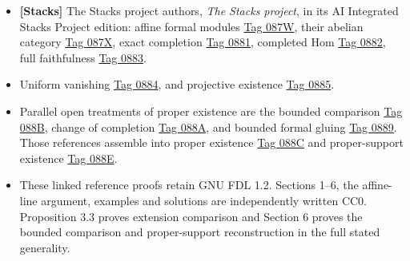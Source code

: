 \documentclass[11pt]{article}
\providecommand{\tightlist}{\setlength{\itemsep}{0pt}\setlength{\parskip}{0pt}}
\begin{document}
\begin{itemize}
\tightlist
\item
  \textbf{{[}Stacks{]}} The Stacks project authors, \emph{The Stacks
  project}, in its AI Integrated Stacks Project edition: affine formal
  modules
  \href{https://kokunoyumeto.github.io/stacks-zh-hans-cn/en/coherent.html\#coherent-lemma-inverse-systems-affine}{Tag
  087W}, their abelian category
  \href{https://kokunoyumeto.github.io/stacks-zh-hans-cn/en/coherent.html\#coherent-lemma-inverse-systems-abelian}{Tag
  087X}, exact completion
  \href{https://kokunoyumeto.github.io/stacks-zh-hans-cn/en/coherent.html\#coherent-lemma-exact}{Tag
  0881}, completed Hom
  \href{https://kokunoyumeto.github.io/stacks-zh-hans-cn/en/coherent.html\#coherent-lemma-completion-internal-hom}{Tag
  0882}, full faithfulness
  \href{https://kokunoyumeto.github.io/stacks-zh-hans-cn/en/coherent.html\#coherent-lemma-fully-faithful}{Tag
  0883}.
\item
  Uniform vanishing
  \href{https://kokunoyumeto.github.io/stacks-zh-hans-cn/en/coherent.html\#coherent-lemma-vanishing-projective}{Tag
  0884}, and projective existence
  \href{https://kokunoyumeto.github.io/stacks-zh-hans-cn/en/coherent.html\#coherent-lemma-existence-projective}{Tag
  0885}.
\item
  Parallel open treatments of proper existence are the bounded
  comparison
  \href{https://kokunoyumeto.github.io/stacks-zh-hans-cn/en/coherent.html\#coherent-lemma-inverse-systems-push-pull}{Tag
  088B}, change of completion
  \href{https://kokunoyumeto.github.io/stacks-zh-hans-cn/en/coherent.html\#coherent-lemma-existence-tricky}{Tag
  088A}, and bounded formal gluing
  \href{https://kokunoyumeto.github.io/stacks-zh-hans-cn/en/coherent.html\#coherent-lemma-existence-easy}{Tag
  0889}. Those references assemble into proper existence
  \href{https://kokunoyumeto.github.io/stacks-zh-hans-cn/en/coherent.html\#coherent-proposition-existence-proper}{Tag
  088C} and proper-support existence
  \href{https://kokunoyumeto.github.io/stacks-zh-hans-cn/en/coherent.html\#coherent-theorem-grothendieck-existence}{Tag
  088E}.
\item
  These linked reference proofs retain GNU FDL 1.2. Sections 1--6, the
  affine-line argument, examples and solutions are independently written
  CC0. Proposition 3.3 proves extension comparison and Section 6 proves
  the bounded comparison and proper-support reconstruction in the full
  stated generality.
\end{itemize}
\end{document}
